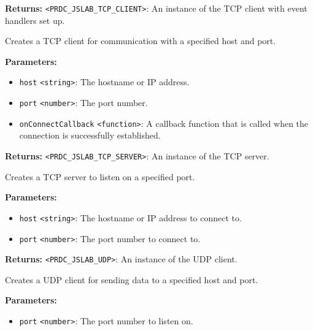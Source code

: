 \documentclass[12pt,a4paper]{article}
\begin{document}
\noindent \textbf{Returns:} \texttt{<PRDC\_JSLAB\_TCP\_CLIENT>}: An instance of the TCP client with event handlers set up.

\noindent Creates a TCP client for communication with a specified host and port.

\vspace{5mm}
\noindent {}


\noindent \textbf{Parameters:}
\begin{itemize}
  \item \texttt{host} \texttt{<string>}: The hostname or IP address.
  \item \texttt{port} \texttt{<number>}: The port number.
  \item \texttt{onConnectCallback} \texttt{<function>}: A callback function that is called when the connection is successfully established.
\end{itemize}

\noindent \textbf{Returns:} \texttt{<PRDC\_JSLAB\_TCP\_SERVER>}: An instance of the TCP server.

\noindent Creates a TCP server to listen on a specified port.

\vspace{5mm}
\noindent {}


\noindent \textbf{Parameters:}
\begin{itemize}
  \item \texttt{host} \texttt{<string>}: The hostname or IP address to connect to.
  \item \texttt{port} \texttt{<number>}: The port number to connect to.
\end{itemize}

\noindent \textbf{Returns:} \texttt{<PRDC\_JSLAB\_UDP>}: An instance of the UDP client.

\noindent Creates a UDP client for sending data to a specified host and port.

\vspace{5mm}
\noindent {}


\noindent \textbf{Parameters:}
\begin{itemize}
  \item \texttt{port} \texttt{<number>}: The port number to listen on.
\end{itemize}
\end{document}
